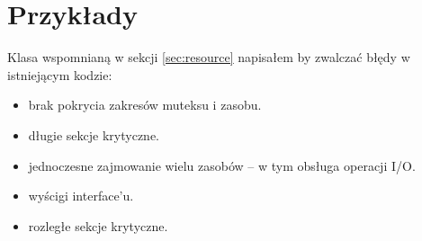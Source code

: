 \section{Przykłady}\label{sec:examples}
Klasa  wspomnianą w sekcji \ref{sec:resource} napisałem by zwalczać błędy w istniejącym kodzie:
\begin{itemize}
\item brak pokrycia zakresów muteksu i zasobu.
\item długie sekcje krytyczne.
\item jednoczesne zajmowanie wielu zasobów -- w tym obsługa operacji I/O.
\item wyścigi interface'u.
\item rozległe sekcje krytyczne.
\end{itemize}




